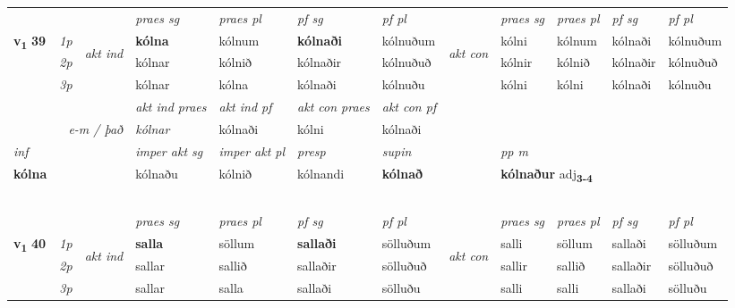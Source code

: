 \begin{longtable}[l]{X>{\footnotesize\itshape}llXXXXlXXXX}
 & &   & \textit{praes sg}  & \textit{praes pl}    & \textit{ pf sg} & \textit{pf pl} & & \textit{praes sg}  & \textit{praes pl}    & \textit{pf sg} & \textit{pf pl }  \\ \cmidrule{4-7} \cmidrule{9-12}
 \multirow{2}{*}{{{\textbf{v{\textsubscript{1}}} \Large{\textbf{39}}}}}  & 1p & \multirow{3}{*}{\begin{turn}{90}\textit{akt ind}\end{turn}} & \textbf{kólna} & kólnum & \textbf{kólnaði} & kólnuðum & \multirow{3}{*}{\begin{turn}{90}\textit{akt con}\end{turn}} &kólni & kólnum & kólnaði & kólnuðum\\*
 & 2p &  &  kólnar  & kólnið & kólnaðir & kólnuðuð & & kólnir & kólnið & kólnaðir & kólnuðuð \\*
 & 3p &  & kólnar & kólna & kólnaði & kólnuðu & & kólni & kólni& kólnaði & kólnuðu \\*
\cmidrule{4-7} \cmidrule{9-12}

   && &  \textit{akt ind praes} & \textit{akt ind pf} & \textit{akt con praes} & \textit{akt con pf} \\*
\multicolumn{3}{r}{\textit{e-m / það}} & kólnar & kólnaði & kólni & kólnaði \\*

\cmidrule{4-7}
   {\textit{inf}} & &  & \textit{imper akt sg} & \textit{imper akt pl}   & \textit{presp} & \textit{supin}  && \textit{pp m} \\*
  {\textbf{kólna}} & && kólnaðu  & kólnið   & kólnandi &  \textbf{kólnað}  && \multicolumn{2}{l}{\textbf{kólnaður} adj\textbf{\textsubscript{3-4}}} \\*

\midrule
& \\*
& \\*
& \\*
& \\*
& \\
\midrule

 & &   & \textit{praes sg}  & \textit{praes pl}    & \textit{ pf sg} & \textit{pf pl} & & \textit{praes sg}  & \textit{praes pl}    & \textit{pf sg} & \textit{pf pl }  \\ \cmidrule{4-7} \cmidrule{9-12}
 \multirow{2}{*}{{{\textbf{v{\textsubscript{1}}} \Large{\textbf{40}}}}}  & 1p & \multirow{3}{*}{\begin{turn}{90}\textit{akt ind}\end{turn}} & \textbf{salla} & söllum & \textbf{sallaði} & sölluðum & \multirow{3}{*}{\begin{turn}{90}\textit{akt con}\end{turn}} &salli & söllum & sallaði & sölluðum\\*
 & 2p &  &  sallar  & sallið & sallaðir & sölluðuð & & sallir & sallið & sallaðir & sölluðuð \\*
 & 3p &  & sallar & salla & sallaði & sölluðu & & salli & salli& sallaði & sölluðu \\*
\cmidrule{4-7} \cmidrule{9-12}


\end{longtable}
